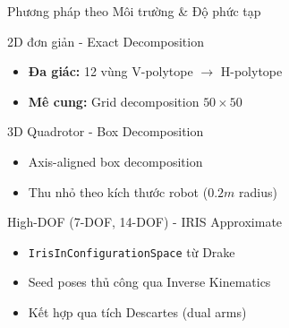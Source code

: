 \documentclass[aspectratio=169]{beamer}
\begin{document}
\begin{frame}{Phương pháp theo Môi trường \& Độ phức tạp}

    \begin{exampleblock}{2D đơn giản - Exact Decomposition}
        \begin{itemize}
            \item \textbf{Đa giác:} 12 vùng V-polytope $\rightarrow$ H-polytope
            \item \textbf{Mê cung:} Grid decomposition $50 \times 50$
        \end{itemize}
    \end{exampleblock}

    \begin{exampleblock}{3D Quadrotor - Box Decomposition}
        \begin{itemize}
            \item Axis-aligned box decomposition
            \item Thu nhỏ theo kích thước robot ($0.2m$ radius)
        \end{itemize}
    \end{exampleblock}

    \begin{alertblock}{High-DOF (7-DOF, 14-DOF) - IRIS Approximate}
        \begin{itemize}
            \item \texttt{IrisInConfigurationSpace} từ Drake
            \item Seed poses thủ công qua Inverse Kinematics
            \item Kết hợp qua tích Descartes (dual arms)
        \end{itemize}
    \end{alertblock}

\end{frame}
\end{document}
